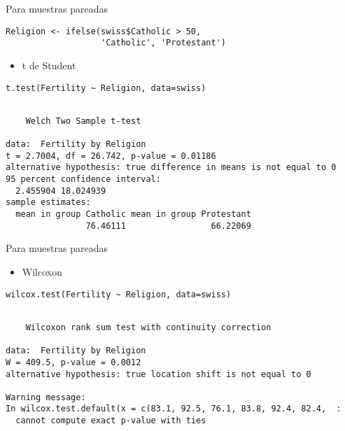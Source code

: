 \documentclass[xcolor={usenames,svgnames,dvipsnames}]{beamer}
\begin{document}
\begin{frame}[fragile,label={sec:org2b84101}]{Para muestras pareadas}
 \lstset{language=r,label= ,caption= ,captionpos=b,numbers=none}
\begin{lstlisting}
Religion <- ifelse(swiss$Catholic > 50,
                   'Catholic', 'Protestant')
\end{lstlisting}

\begin{itemize}
\item t de Student
\end{itemize}
\lstset{language=r,label= ,caption= ,captionpos=b,numbers=none}
\begin{lstlisting}
t.test(Fertility ~ Religion, data=swiss)
\end{lstlisting}

\begin{verbatim}

	Welch Two Sample t-test

data:  Fertility by Religion
t = 2.7004, df = 26.742, p-value = 0.01186
alternative hypothesis: true difference in means is not equal to 0
95 percent confidence interval:
  2.455904 18.024939
sample estimates:
  mean in group Catholic mean in group Protestant 
                76.46111                 66.22069
\end{verbatim}
\end{frame}

\begin{frame}[fragile,label={sec:org526a702}]{Para muestras pareadas}
 \begin{itemize}
\item Wilcoxon
\end{itemize}
\lstset{language=r,label= ,caption= ,captionpos=b,numbers=none}
\begin{lstlisting}
wilcox.test(Fertility ~ Religion, data=swiss)
\end{lstlisting}

\begin{verbatim}

	Wilcoxon rank sum test with continuity correction

data:  Fertility by Religion
W = 409.5, p-value = 0.0012
alternative hypothesis: true location shift is not equal to 0

Warning message:
In wilcox.test.default(x = c(83.1, 92.5, 76.1, 83.8, 92.4, 82.4,  :
  cannot compute exact p-value with ties
\end{verbatim}
\end{frame}
\end{document}
